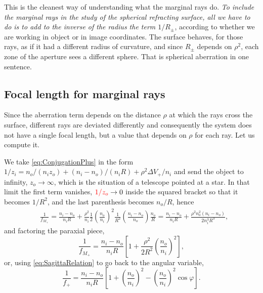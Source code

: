                     This is the cleanest way of understanding what the marginal rays do. \textit{To include the marginal rays in the study of the spherical refracting surface, all we have to do is to add to the inverse of the radius the term $1/R_\pm$}, according to whether we are working in object or in image coordinates. The surface behaves, for those rays, as if it had a different radius of curvature, and since $R_\pm$ depends on $\rho^2$, each zone of the aperture sees a different sphere. That is spherical aberration in one sentence.

            \subsection{Focal length for marginal rays}

                Since the aberration term depends on the distance $\rho$ at which the rays cross the surface, different rays are deviated differently and consequently the system does not have a single focal length, but a value that depends on $\rho$ for each ray. Let us compute it.

                We take \ref{eq:ConjugationPlus} in the form $1/z_i = n_o/(n_iz_o) + (n_i-n_o)/(n_iR) + \rho^2\Delta V_+/n_i$ and send the object to infinity, $z_o\to\infty$, which is the situation of a telescope pointed at a star. In that limit the first term vanishes, ${\color{red}1/z_o}\to0$ inside the squared bracket so that it becomes $1/R^2$, and the last parenthesis becomes $n_o/R$, hence
                \begin{align*}
                    & \frac{1}{f_{M_+}} = \frac{n_i-n_o}{n_iR} + \frac{\rho^2}{n_i}\frac{1}{2}\left( \frac{n_o}{n_i} \right)^2\frac{1}{R^2}\left( \frac{n_i-n_o}{n_o} \right)\frac{n_o}{R} = \frac{n_i-n_o}{n_iR} + \frac{\rho^2n_o^2\left(n_i-n_o\right)}{2n_i^3R^3},
                \end{align*}
                and factoring the paraxial piece,
                \begin{equation}\label{eq:MarginalFocalPlus}
                    \frac{1}{f_{M_+}} = \frac{n_i-n_o}{n_iR}\left[ 1 + \frac{\rho^2}{2R^2}\left( \frac{n_o}{n_i} \right)^2 \right],
                \end{equation}
                or, using \ref{eq:SagittaRelation} to go back to the angular variable,
                \begin{equation}\label{eq:MarginalFocalPhi}
                    \frac{1}{f_{+}} = \frac{n_i-n_o}{n_iR}\left[ 1 + \left( \frac{n_o}{n_i} \right)^2 - \left( \frac{n_o}{n_i} \right)^2\cos\varphi \right].
                \end{equation}

